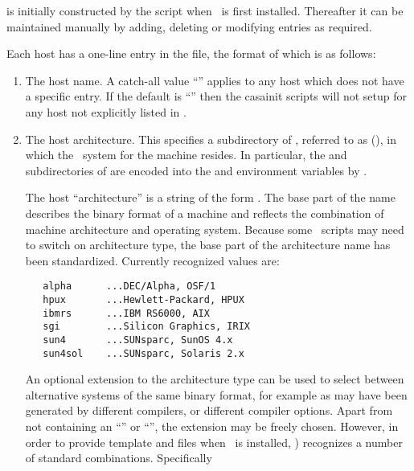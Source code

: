  is initially constructed by the  script
when \aipspp\ is first installed.  Thereafter it can be maintained manually by
adding, deleting or modifying entries as required.

Each host has a one-line entry in the  file, the format of
which is as follows:

\begin{enumerate}
\item
   The host name.  A catch-all value ``'' applies to any host
   which does not have a specific entry. If the default is ``''
   then the casainit scripts will not setup  for any host
   not explicitly listed in .

\item
   The host architecture.  This specifies a subdirectory of ,
   referred to as  (), in which the \aipspp\ 
   system for the machine resides.  In particular, the  and
   \file{doc} subdirectories of \file{\$AIPSARCH} are encoded into the
   \code{PATH} and \code{MANPATH} environment variables by .

   The host ``architecture'' is a string of the form .
   The base part of the name describes the binary format of a machine and
   reflects the combination of machine architecture and operating system.
   Because some \aipspp\ scripts may need to switch on architecture type,
   the base part of the architecture name has been standardized.  Currently
   recognized values are:

\begin{verbatim}
   alpha      ...DEC/Alpha, OSF/1
   hpux       ...Hewlett-Packard, HPUX
   ibmrs      ...IBM RS6000, AIX
   sgi        ...Silicon Graphics, IRIX
   sun4       ...SUNsparc, SunOS 4.x
   sun4sol    ...SUNsparc, Solaris 2.x
\end{verbatim}

   \noindent
   An optional extension to the architecture type can be used to select
   between alternative systems of the same binary format, for example as may
   have been generated by different compilers, or different compiler options.
   Apart from not containing an ``\code{\_}'' or ``\code{:}'', the extension
   may be freely chosen.  However, in order to provide template
    and  files when \aipspp\ is installed,
   \exeref{configure}) recognizes a number of standard combinations.
   Specifically


\end{enumerate}
